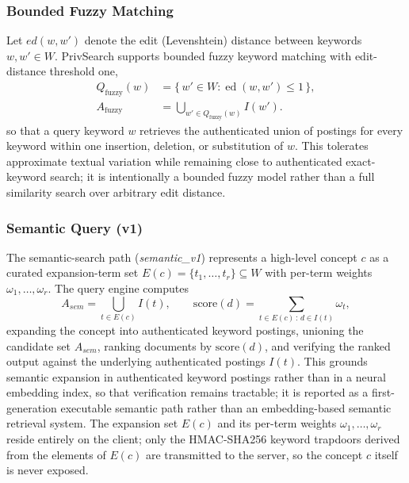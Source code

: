 \subsubsection{Bounded Fuzzy Matching}
\label{3C5}
Let $ed(w,w')$ denote the edit (Levenshtein) distance between keywords $w,w' \in W$. PrivSearch supports bounded fuzzy keyword matching with edit-distance threshold one,
\begin{equation}
\begin{aligned}
Q_{\mathrm{fuzzy}}(w)
    &= \{\,w' \in W : \operatorname{ed}(w,w') \leq 1\,\},\\
A_{\mathrm{fuzzy}}
    &= \bigcup_{w' \in Q_{\mathrm{fuzzy}}(w)} I(w').
\end{aligned}
\label{eq:qfuzzy}
\end{equation}
so that a query keyword $w$ retrieves the authenticated union of postings for every keyword within one insertion, deletion, or substitution of $w$. This tolerates approximate textual variation while remaining close to authenticated exact-keyword search; it is intentionally a bounded fuzzy model rather than a full similarity search over arbitrary edit distance.

\subsubsection{Semantic Query (v1)}
\label{3C6}
The semantic-search path (\emph{semantic\_v1}) represents a high-level concept $c$ as a curated expansion-term set $E(c)=\{t_1,\dots,t_r\} \subseteq W$ with per-term weights $\omega_1,\dots,\omega_r$. The query engine computes
\begin{equation}
A_{sem} = \bigcup_{t \in E(c)} I(t), \qquad
\mathrm{score}(d) = \!\!\sum_{t \in E(c)\,:\,d \in I(t)}\!\! \omega_t,
\label{eq:qsem}
\end{equation}
expanding the concept into authenticated keyword postings, unioning the candidate set $A_{sem}$, ranking documents by $\mathrm{score}(d)$, and verifying the ranked output against the underlying authenticated postings $I(t)$. This grounds semantic expansion in authenticated keyword postings rather than in a neural embedding index, so that verification remains tractable; it is reported as a first-generation executable semantic path rather than an embedding-based semantic retrieval system.
The expansion set $E(c)$ and its per-term weights $\omega_1,\dots,\omega_r$ reside entirely on the client; only the HMAC-SHA256 keyword trapdoors derived from the elements of $E(c)$ are transmitted to the server, so the concept $c$ itself is never exposed.

